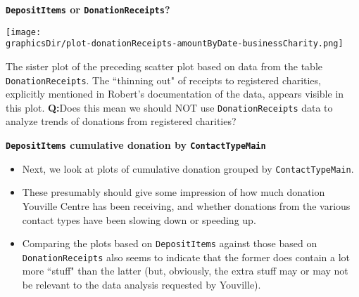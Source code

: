 \begin{frame}{\bf\texttt{DepositItems} or \texttt{DonationReceipts}?}
\tiny

\vskip 0.8cm

\begin{center}
\texttt{[image: \\graphicsDir/plot-donationReceipts-amountByDate-businessCharity.png]}
\end{center}

\begin{flushleft}
The sister plot of the preceding scatter plot based on data from the table \texttt{DonationReceipts}.
The ``thinning out" of receipts to registered charities,
{\color{red}explicitly mentioned in Robert's documentation of the data},
appears visible in this plot.
\vskip 0.1cm
\textbf{Q:}\;\;Does this mean we should {\color{red}NOT} use \texttt{DonationReceipts} data to analyze trends
of donations from registered charities?
\end{flushleft}

\end{frame}
\normalsize

\begin{frame}{\large\bf \texttt{DepositItems} cumulative donation by \texttt{ContactTypeMain}}
\small
\vskip 0.5cm

\begin{itemize}
\item	Next, we look at plots of cumulative donation grouped by \texttt{ContactTypeMain}.

\vskip 0.5cm
\item	These presumably should give some impression of how much donation Youville Centre has been receiving,
	and whether donations from the various contact types have been slowing down or speeding up.

\vskip 0.5cm
\item	Comparing the plots based on \texttt{DepositItems} against those based on \texttt{DonationReceipts}
	also seems to indicate that the former does contain a lot more ``stuff" than the latter (but, obviously,
	the extra stuff may or may not be relevant to the data analysis requested by Youville).

\end{itemize}

\end{frame}
\normalsize


